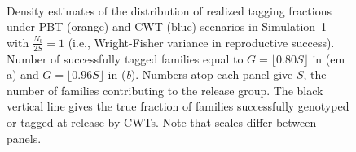\documentclass[11pt]{article}
\begin{document}
\begin{figure}
\centering
\mbox{
	~~~~~
}
\caption{Density estimates of the distribution of realized tagging fractions under PBT (orange) and CWT (blue) scenarios
in Simulation~1 with $\frac{N_b}{2S} = 1$ (i.e., Wright-Fisher variance in reproductive success). Number of successfully tagged families
equal to $G = \lfloor0.80S\rfloor$ in ({em a}) and $G = \lfloor0.96S\rfloor$ in ({\em b}).  Numbers
atop each panel give $S$, the number of families contributing to the release group. The black vertical line
gives the true fraction of families successfully genotyped or tagged at release by CWTs. Note that
scales differ between panels.}
\label{fig:wf80}
\end{figure}
\end{document}
